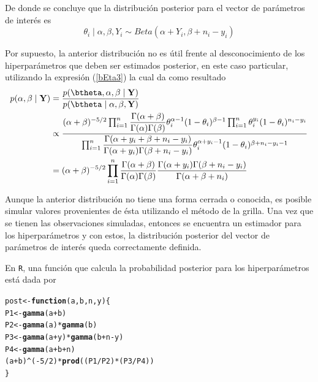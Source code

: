 \documentclass[10pt,openright]{book}\usepackage[]{graphicx}\usepackage[]{color}
\makeatletter
\newcommand{\hlnum}[1]{\textcolor[rgb]{0.686,0.059,0.569}{#1}}%
\newcommand{\hlopt}[1]{\textcolor[rgb]{0,0,0}{#1}}%
\newcommand{\hlstd}[1]{\textcolor[rgb]{0.345,0.345,0.345}{#1}}%
\newcommand{\hlkwa}[1]{\textcolor[rgb]{0.161,0.373,0.58}{\textbf{#1}}}%
\newcommand{\hlkwb}[1]{\textcolor[rgb]{0.69,0.353,0.396}{#1}}%
\newcommand{\hlkwc}[1]{\textcolor[rgb]{0.333,0.667,0.333}{#1}}%
\newcommand{\hlkwd}[1]{\textcolor[rgb]{0.737,0.353,0.396}{\textbf{#1}}}%
\newenvironment{kframe}{%
 \def\at@end@of@kframe{}%
 \ifinner\ifhmode%
  \def\at@end@of@kframe{\end{minipage}}%
  \begin{minipage}{\columnwidth}%
 \fi\fi%
 \def\FrameCommand##1{\hskip\@totalleftmargin \hskip-\fboxsep
 \colorbox{shadecolor}{##1}\hskip-\fboxsep
     \hskip-\linewidth \hskip-\@totalleftmargin \hskip\columnwidth}%
 \MakeFramed {\advance\hsize-\width
   \@totalleftmargin\z@ \linewidth\hsize
   \@setminipage}}%
 {\par\unskip\endMakeFramed%
 \at@end@of@kframe}
\newenvironment{knitrout}{}{} %
\makeatother
\begin{document}
De donde se concluye que la distribuci\'on posterior para el vector de par\'ametros de inter\'es es
\begin{equation*}
\theta_i \mid \alpha,\beta,Y_i \sim Beta(\alpha+Y_i, \beta+n_i-y_i)
\end{equation*}

Por supuesto, la anterior distribuci\'on no es \'util frente al desconocimiento de los hiperpar\'ametros que deben ser estimados posterior, en este caso particular, utilizando la expresi\'on (\ref{bEta3}) la cual da como resultado
\begin{align*}
p(\alpha,\beta \mid \mathbf{Y})
&=\frac{p(\btheta, \alpha,\beta \mid \mathbf{Y})}{p(\btheta \mid \alpha,\beta,\mathbf{Y})}\\
&\propto
\frac{(\alpha+\beta)^{-5/2}\prod_{i=1}^n \dfrac{\Gamma(\alpha+\beta)}{\Gamma(\alpha)\Gamma(\beta)}
\theta_i^{\alpha-1}(1-\theta_i)^{\beta-1}\prod_{i=1}^n \theta_i^{y_i}(1-\theta_i)^{n_i-y_i}}
{\prod_{i=1}^n \dfrac{\Gamma(\alpha+y_i+\beta+n_i-y_i)}{\Gamma(\alpha+y_i)\Gamma(\beta+n_i-y_i)}
\theta_i^{\alpha+y_i-1}(1-\theta_i)^{\beta+n_i-y_i-1}}\\
&=(\alpha+\beta)^{-5/2}
\prod_{i=1}^n \frac{\Gamma(\alpha+\beta)}{\Gamma(\alpha)\Gamma(\beta)}
\frac{\Gamma(\alpha+y_i)\Gamma(\beta+n_i-y_i)}{\Gamma(\alpha+\beta+n_i)}
\end{align*}

Aunque la anterior distribuci\'on no tiene una forma cerrada o conocida, es posible simular valores provenientes de \'esta utilizando el m\'etodo de la grilla. Una vez que se tienen las observaciones simuladas, entonces se encuentra un estimador para los hiperpar\'ametros y con estos, la distribuci\'on posterior del vector de par\'ametros de inter\'es queda correctamente definida.

En \verb'R', una funci\'on que calcula la probabilidad posterior para los hiperpar\'ametros est\'a dada por
\begin{knitrout}
\color{fgcolor}\begin{kframe}
\begin{alltt}
\hlstd{post}\hlkwb{<-}\hlkwa{function}\hlstd{(}\hlkwc{a}\hlstd{,}\hlkwc{b}\hlstd{,}\hlkwc{n}\hlstd{,}\hlkwc{y}\hlstd{)\{}
   \hlstd{P1}\hlkwb{<-} \hlkwd{gamma}\hlstd{(a}\hlopt{+}\hlstd{b)}
   \hlstd{P2}\hlkwb{<-} \hlkwd{gamma}\hlstd{(a)}\hlopt{*}\hlkwd{gamma}\hlstd{(b)}
   \hlstd{P3}\hlkwb{<-} \hlkwd{gamma}\hlstd{(a}\hlopt{+}\hlstd{y)}\hlopt{*}\hlkwd{gamma}\hlstd{(b}\hlopt{+}\hlstd{n}\hlopt{-}\hlstd{y)}
   \hlstd{P4}\hlkwb{<-} \hlkwd{gamma}\hlstd{(a}\hlopt{+}\hlstd{b}\hlopt{+}\hlstd{n)}
   \hlstd{(a}\hlopt{+}\hlstd{b)}\hlopt{^}\hlstd{(}\hlopt{-}\hlnum{5}\hlopt{/}\hlnum{2}\hlstd{)}\hlopt{*}\hlkwd{prod}\hlstd{((P1}\hlopt{/}\hlstd{P2)}\hlopt{*}\hlstd{(P3}\hlopt{/}\hlstd{P4))}
 \hlstd{\}}
\end{alltt}
\end{kframe}
\end{knitrout}
\end{document}
